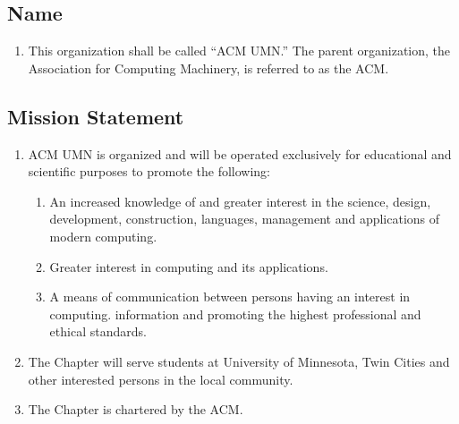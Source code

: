 \subsection{Name}
\begin{enumerate}
	\item This organization shall be called ``ACM UMN.'' The parent organization, the Association for Computing Machinery, is referred to as the ACM.
\end{enumerate}

\subsection{Mission Statement}
\begin{enumerate}
	\item ACM UMN is organized and will be operated exclusively for educational and scientific purposes to promote the following:
		\begin{enumerate}
			\item An increased knowledge of and greater interest in the science, design, development, construction, languages, management and applications of modern computing.
			\item Greater interest in computing and its applications.
			\item A means of communication between persons having an interest in computing. information and promoting the highest professional and ethical standards.
		\end{enumerate}
	\item The Chapter will serve students at University of Minnesota, Twin Cities and other interested persons in the local community.
	\item The Chapter is chartered by the ACM.
\end{enumerate}
